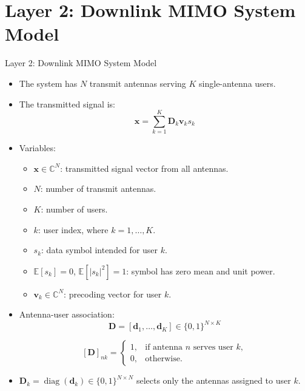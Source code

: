 \documentclass{beamer}
\begin{document}
\section{Layer 2: Downlink MIMO System Model}
\begin{frame}{Layer 2: Downlink MIMO System Model}
\small

\begin{itemize}
    \item The system has \(N\) transmit antennas serving \(K\) single-antenna users.

    \item The transmitted signal is:
    \[
        \mathbf{x}
        =
        \sum_{k=1}^{K}
        \mathbf{D}_k\mathbf{v}_k s_k
    \]

    \item Variables:
    \begin{itemize}
        \item \(\mathbf{x}\in\mathbb{C}^{N}\): transmitted signal vector from all antennas.
        \item \(N\): number of transmit antennas.
        \item \(K\): number of users.
        \item \(k\): user index, where \(k=1,\ldots,K\).
        \item \(s_k\): data symbol intended for user \(k\).
        \item \(\mathbb{E}[s_k]=0\), \(\mathbb{E}[|s_k|^2]=1\): symbol has zero mean and unit power.
        \item \(\mathbf{v}_k\in\mathbb{C}^{N}\): precoding vector for user \(k\).
    \end{itemize}

    \item Antenna-user association:
    \[
        \mathbf{D}
        =
        [\mathbf{d}_1,\ldots,\mathbf{d}_K]
        \in \{0,1\}^{N\times K}
    \]

    \[
        [\mathbf{D}]_{nk}
        =
        \begin{cases}
        1, & \text{if antenna } n \text{ serves user } k,\\
        0, & \text{otherwise}.
        \end{cases}
    \]

    \item \(\mathbf{D}_k=\operatorname{diag}(\mathbf{d}_k)\in\{0,1\}^{N\times N}\) selects only the antennas assigned to user \(k\).
\end{itemize}

\end{frame}
\end{document}
